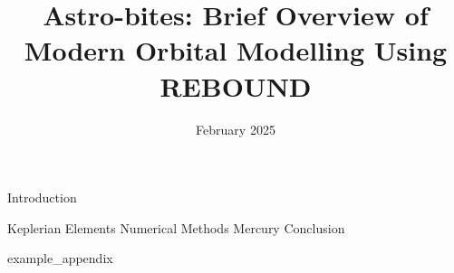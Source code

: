 \documentclass[conference]{IEEEtran}
\title{Astro-bites: Brief Overview of Modern Orbital Modelling Using REBOUND}
\author{
    \IEEEauthorblockN{[REDACTED]}
    \IEEEauthorblockA{Department of Physics, NTNU\\
    \textit{[REDACTED]@stud.ntnu.no}} 
}
\date{February 2025}
\begin{document}
\maketitle
\frontmatter



\mainmatter

{Introduction}

{Keplerian Elements}
{Numerical Methods}
{Mercury}
{Conclusion}
 
\printbibliography[heading = bibintoc, title = Bibliography]    %

\addappendix
{example_appendix}
\end{document}
